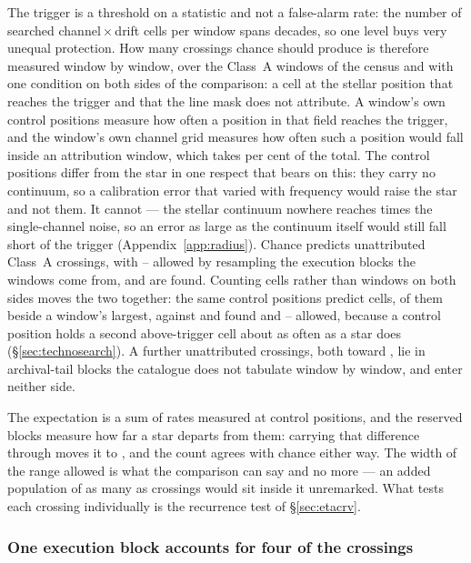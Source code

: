 The trigger is a threshold on a statistic and not a false-alarm rate: the
number of searched channel\,$\times$\,drift cells per window spans
\TuCellsDecades{} decades, so one level buys very unequal protection. How
many crossings chance should produce is therefore measured window by window,
over the \CeNWin{} Class~A windows of the census and with one condition on
both sides of the comparison: a cell at the stellar position that reaches the
trigger and that the line mask does not attribute. A window's own \NCtrl{}
control positions measure how often a position in that field reaches the
trigger, and the window's own channel grid measures how often such a position
would fall inside an attribution window, which takes \CeMaskPct{} per cent of
the total. The control positions differ from the star in one respect that
bears on this: they carry no continuum, so a calibration error that varied
with frequency would raise the star and not them. It cannot --- the stellar
continuum nowhere reaches \CdCnrMax{} times the single-channel noise, so an
error as large as the continuum itself would still fall short of the trigger
(Appendix~\ref{app:radius}). Chance predicts \CeExp{} unattributed Class~A
crossings, with \CeLo--\CeHi{} allowed by resampling the execution blocks the
windows come from, and \CeObs{} are found. Counting cells rather than windows
on both sides moves the two together: the same \CkNCtrlPos{} control positions
predict \CkExp{} cells, \CkExpSec{} of them beside a window's largest, against
\CkNObs{} and \CkNSecUnattr{} found and \CkLo--\CkHi{} allowed, because a
control position holds a second above-trigger cell about as often as a star
does (\S\ref{sec:technosearch}). A further \CeNTailCrossWord{} unattributed
crossings, both toward \CeTailStar, lie in archival-tail blocks the catalogue
does not tabulate window by window, and enter neither side.

The expectation is a sum of rates measured at control positions, and the
reserved blocks measure how far a star departs from them: carrying that
difference through moves it to \CeExpX, and the count agrees with chance
either way. The width of the range allowed is what the comparison can say and
no more --- an added population of as many as \CeAddBlind{} crossings would
sit inside it unremarked. What tests each crossing individually is the
recurrence test of \S\ref{sec:etacrv}.

\subsubsection{One execution block accounts for four of the crossings}
\label{sec:bdblock}

